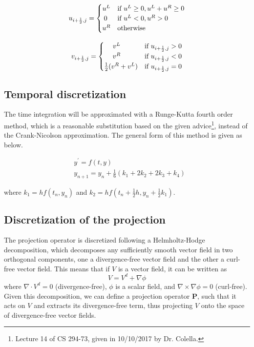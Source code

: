 \documentclass{article}
\begin{document}
\begin{equation}
\label{eq:defu}
\begin{matrix}
	u_{i+\frac{1}{2},j} =
		\begin{cases}
	        \hfill u^L \hfill &\text{if } u^L \geq 0, u^L +u^R \geq 0\\
			\hfill 0 \hfill & \text{if } u^L < 0, u^R > 0\\
			\hfill u^R \hfill & \text{otherwise}   
	   \end{cases}
	   \\\\
   v_{i+\frac{1}{2},j} =
		\begin{cases}
			\hfill v^L \hfill & \text{if }  u_{i+\frac{1}{2},j} > 0\\
			\hfill v^R \hfill & \text{if } u_{i+\frac{1}{2},j} < 0\\
			\hfill \frac{1}{2}(v^R+v^L) \hfill & \text{if } u_{i+\frac{1}{2},j} = 0
		\end{cases}
\end{matrix}
\end{equation}
 
\subsection{Temporal discretization}

The time integration will be approximated with a Runge-Kutta fourth order method, which is a reasonable substitution based on the given advice\footnote{Lecture 14 of CS 294-73, given in 10/10/2017 by Dr. Colella.}, instead of the Crank-Nicolson approximation. The general form of this method is given as below.

 \begin{equation}
\label{eq:rk4}
\begin{split}
&y^\prime = f(t,y) \\
&y_{n+1} = y_n + \frac{1}{6}( k_1 + 2k_2 + 2k_3 + k_4)
\end{split}
 \end{equation}
 
where $k_1 = hf(t_n,y_n)$ and  $k_2 = hf(t_n + \frac{1}{2}h, y_n + \frac{1}{2}k_1)$.

\subsection{Discretization of the projection}
\label{ssec:projection}

The projection operator is discretized following a Helmholtz-Hodge decomposition, which decomposes any sufficiently smooth vector field in two orthogonal components, one a divergence-free vector field and the other a curl-free vector field. This means that if $V$ is a vector field, it can be written as
\begin{equation}
\label{eq:hodge}
	V = V^d + \nabla \phi
\end{equation}
where $\nabla \cdot V^d = 0$ (divergence-free), $\phi$ is a scalar field, and $\nabla \times \nabla \phi = 0$ (curl-free). Given this decomposition, we can define a projection operator $\mathbf{P}$, such that it acts on $V$ and extracts its divergence-free term, thus projecting $V$ onto the space of divergence-free vector fields.
\end{document}
